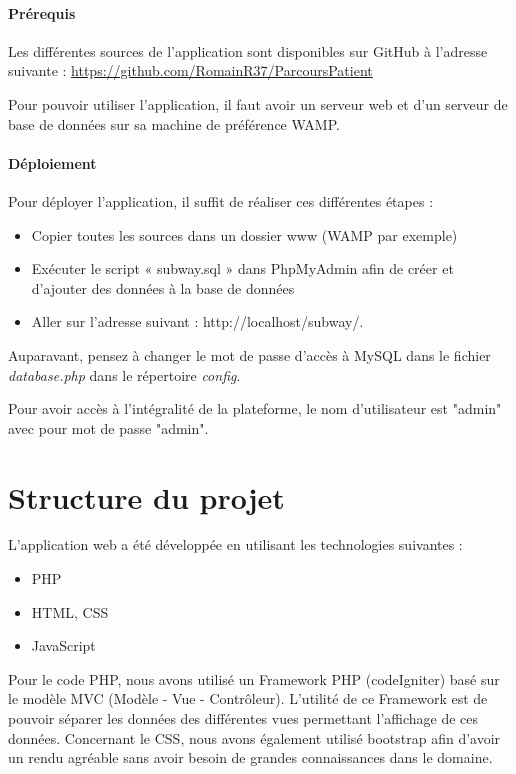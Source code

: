 \documentclass[noposter]{polytech/polytech}
\begin{document}
\paragraph{Prérequis}

Les différentes sources de l'application sont disponibles sur GitHub à l'adresse suivante :
\url{https://github.com/RomainR37/ParcoursPatient}

Pour pouvoir utiliser l'application, il faut avoir un serveur web et d'un serveur de base de données sur sa machine de préférence WAMP.

\paragraph{Déploiement}

Pour déployer l'application, il suffit de réaliser ces différentes étapes :
\begin{itemize}
	\item Copier toutes les sources dans un dossier www (WAMP par exemple)
	\item Exécuter le script « subway.sql » dans PhpMyAdmin afin de créer et d'ajouter des données à la base de données 
	\item Aller sur l'adresse suivant : http://localhost/subway/.
\end{itemize}

Auparavant, pensez à changer le mot de passe d'accès à MySQL dans le fichier \textit{database.php} dans le répertoire \textit{config}.

Pour avoir accès à l'intégralité de la plateforme, le nom d'utilisateur est "admin" avec pour mot de passe "admin".

\section{Structure du projet}

L'application web a été développée en utilisant les technologies suivantes :
\begin{itemize}
	\item PHP
	\item HTML, CSS
	\item JavaScript
\end{itemize}

Pour le code PHP, nous avons utilisé un Framework PHP (codeIgniter) basé sur le modèle MVC (Modèle - Vue - Contrôleur). L'utilité de ce Framework est de pouvoir séparer les données des différentes vues permettant l'affichage de ces données. Concernant le CSS, nous avons également utilisé bootstrap afin d'avoir un rendu agréable sans avoir besoin de grandes connaissances dans le domaine.
 
\end{document}
